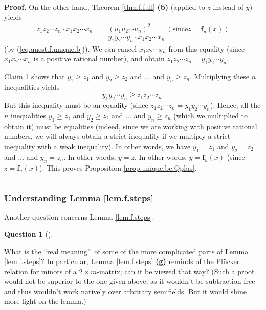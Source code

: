 \documentclass[numbers=enddot,12pt,final,onecolumn,notitlepage]{scrartcl}%
\theoremstyle{definition}
\newtheorem{quest}[theo]{Question}
\newenvironment{question}[1][]
{\begin{quest}[#1]\begin{leftbar}}
{\end{leftbar}\end{quest}}
\newenvironment{proof}[1][Proof]{\noindent\textbf{#1.} }{\ \rule{0.5em}{0.5em}}
\newenvironment{question}[1][Question]{\noindent\textbf{#1.} }{\ \rule{0.5em}{0.5em}}
\newenvironment{verlong}{}{}
\begin{document}
\begin{verlong}
\begin{proof}
On the other hand, Theorem \ref{thm.f.full} \textbf{(b)} (applied to $z$
instead of $y$) yields%
\begin{align*}
z_{1}z_{2}\cdots z_{n}\cdot x_{1}x_{2}\cdots x_{n}  &  =\left(  u_{1}%
u_{2}\cdots u_{n}\right)  ^{2}\ \ \ \ \ \ \ \ \ \ \left(  \text{since
}z=\mathbf{f}_{u}\left(  x\right)  \right) \\
&  =y_{1}y_{2}\cdots y_{n}\cdot x_{1}x_{2}\cdots x_{n}%
\end{align*}
(by (\ref{eq.quest.f.unique.b})). We can cancel $x_{1}x_{2}\cdots x_{n}$ from
this equality (since $x_{1}x_{2}\cdots x_{n}$ is a positive rational number),
and obtain $z_{1}z_{2}\cdots z_{n}=y_{1}y_{2}\cdots y_{n}$.

Claim 1 shows that $y_{1}\geq z_{1}$ and $y_{2}\geq z_{2}$ and $\ldots$ and
$y_{n}\geq z_{n}$. Multiplying these $n$ inequalities yields%
\[
y_{1}y_{2}\cdots y_{n}\geq z_{1}z_{2}\cdots z_{n}.
\]
But this inequality must be an equality (since $z_{1}z_{2}\cdots z_{n}%
=y_{1}y_{2}\cdots y_{n}$). Hence, all the $n$ inequalities $y_{1}\geq z_{1}$
and $y_{2}\geq z_{2}$ and $\ldots$ and $y_{n}\geq z_{n}$ (which we multiplied
to obtain it) must be equalities (indeed, since we are working with positive
rational numbers, we will always obtain a strict inequality if we multiply a
strict inequality with a weak inequality). In other words, we have
$y_{1}=z_{1}$ and $y_{2}=z_{2}$ and $\ldots$ and $y_{n}=z_{n}$. In other
words, $y=z$. In other words, $y=\mathbf{f}_{u}\left(  x\right)  $ (since
$z=\mathbf{f}_{u}\left(  x\right)  $). This proves Proposition
\ref{prop.unique.bc.Qplus}.
\end{proof}
\end{verlong}

\subsubsection{Understanding Lemma \ref{lem.f.steps}}

Another question concerns Lemma \ref{lem.f.steps}:

\begin{question}
What is the \textquotedblleft real meaning\textquotedblright\ of some of the
more complicated parts of Lemma \ref{lem.f.steps}? In particular, Lemma
\ref{lem.f.steps} \textbf{(g)} reminds of the Pl\"{u}cker relation for minors
of a $2\times m$-matrix; can it be viewed that way? (Such a proof would not be
superior to the one given above, as it wouldn't be subtraction-free and thus
wouldn't work natively over arbitrary semifields. But it would shine more
light on the lemma.)
\end{question}
\end{document}
